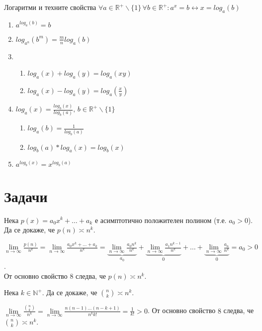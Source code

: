 \begin{boxfact}{Логаритми и техните свойства}{}\label{fact-log-props}
	$\forall a\in\mathbb{R}^+\backslash\{1\}\,\forall b\in\mathbb{R}^+:a^x=b\leftrightarrow x=log_a(b)$
	\begin{enumerate}
		\item $a^{log_a(b)}=b$
		\item $log_{a^n}(b^m)=\frac mnlog_a(b)$
		\item
		\begin{enumerate}
			\item $log_a(x)+log_a(y)=log_a(xy)$
			\item $log_a(x)-log_a(y)=log_a(\frac{x}{y})$
		\end{enumerate}
		\item $log_a(x)=\frac{log_b(x)}{log_b(a)},\,b\in\mathbb{R}^+\backslash\{1\}$
		\begin{enumerate}
			\item $log_a(b)=\frac{1}{log_b(a)}$
			\item $log_b(a)*log_a(x)=log_b(x)$
		\end{enumerate}
		\item $a^{log_b(x)}=x^{log_b(a)}$
	\end{enumerate}
\end{boxfact}\leavevmode\newline


\section{Задачи}

\begin{problem}
	Нека $p(x)=a_0x^k+\dots+a_k$ е асимптотично положителен полином (т.е. $a_0>0$). Да се докаже, че $p(n)\asymp n^k$.
\end{problem}
\begin{solution}
	$\lim\limits_{n\to\infty}\frac{p(n)}{n^k}=\lim\limits_{n\to\infty}\frac{a_0x^k+\dots+a_k}{n^k}=\underbrace{\lim\limits_{n\to\infty}\frac{a_0n^k}{n^k}}_{a_0}+\underbrace{\lim\limits_{n\to\infty}\frac{a_1n^{k-1}}{n^k}}_0+\dots+\underbrace{\lim\limits_{n\to\infty}\frac{a_n}{n^k}}_0=a_0>0$.\\
	От основно свойство $\hyperref[mprop-1]{8}$ следва, че $p(n)\asymp n^k$.
\end{solution}\leavevmode\newline

\begin{problem}
	Нека $k\in\mathbb{N}^+$. Да се докаже, че $\binom nk\asymp n^k$.
\end{problem}
\begin{solution}
	$\lim\limits_{n\to\infty}\frac{\binom nk}{n^k}=\lim\limits_{n\to\infty}\frac{n(n-1)\dots(n-k+1)}{n^kk!}=\frac1{k!}>0$.
	От основно свойство $\hyperref[mprop-1]{8}$ следва, че $\binom nk\asymp n^k$.
\end{solution}\leavevmode\newline

